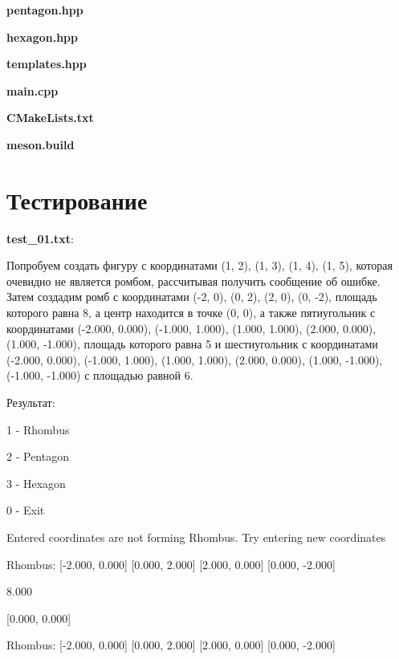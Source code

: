 \documentclass[a4paper, 12pt]{article}
\begin{document}
\vspace{3ex}
\textbf{\large{pentagon.hpp}}


\vspace{3ex}
\textbf{\large{hexagon.hpp}}


\vspace{3ex}
\textbf{\large{templates.hpp}}


\vspace{3ex}
\textbf{\large{main.cpp}}


\vspace{3ex}
\textbf{\large{CMakeLists.txt}}


\vspace{3ex}
\textbf{\large{meson.build}}

\newpage
\section{Тестирование}
\vspace{3ex}

\textbf{test\_01.txt}:

Попробуем создать фигуру с координатами (1, 2), (1, 3), (1, 4), (1, 5), которая очевидно не является ромбом, рассчитывая получить сообщение об ошибке. Затем создадим ромб с координатами (-2, 0), (0, 2), (2, 0), (0, -2), площадь которого равна 8, а центр находится в точке (0, 0), а также пятиугольник с координатами (-2.000, 0.000), (-1.000, 1.000), (1.000, 1.000), (2.000, 0.000), (1.000, -1.000), площадь которого равна 5 и шестиугольник с координатами
(-2.000, 0.000), (-1.000, 1.000), (1.000, 1.000), (2.000, 0.000), (1.000, -1.000), (-1.000, -1.000) с площадью равной 6.

Результат:

1 - Rhombus

2 - Pentagon

3 - Hexagon

0 - Exit

Entered coordinates are not forming Rhombus. Try entering new coordinates

Rhombus: [-2.000, 0.000] [0.000, 2.000] [2.000, 0.000] [0.000, -2.000]

8.000

[0.000, 0.000]

Rhombus: [-2.000, 0.000] [0.000, 2.000] [2.000, 0.000] [0.000, -2.000] 
\end{document}
